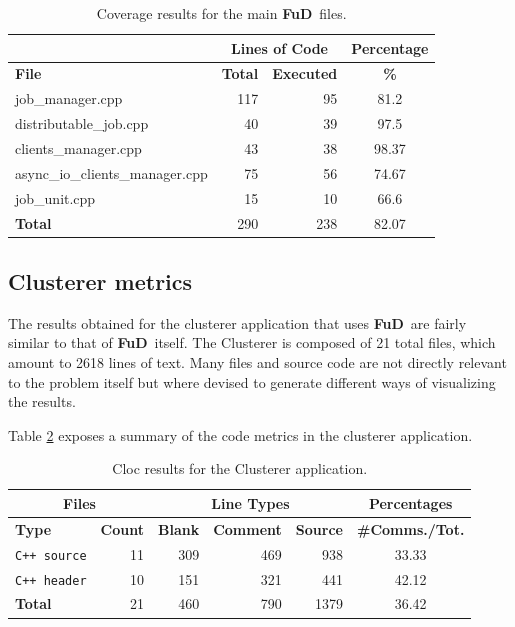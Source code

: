 \documentclass[a4paper,12pt,english]{report}
\newcommand{\fud}{\textbf{FuD}}
\begin{document}
\begin{table}[!htf]
\begin{center}
\begin{tabular}{|l|r|r|c|}
\hline
 & \multicolumn{2}{|c|}{Lines of Code} & Percentage \\
\hline
\textbf{File} & \textbf{Total} & \textbf{Executed} & \textbf{\%} \\
\hline
\scriptsize{job\_manager.cpp} & 117 & 95 & 81.2 \\
\hline 
\scriptsize{distributable\_job.cpp} & 40 & 39 & 97.5 \\
\hline 
\scriptsize{clients\_manager.cpp} & 43 & 38 & 98.37 \\
\hline 
\scriptsize{async\_io\_clients\_manager.cpp} & 75 & 56 & 74.67 \\
\hline 
\scriptsize{job\_unit.cpp} & 15 & 10 & 66.6 \\
\hline 
\textbf{Total} & 290 & 238 & 82.07 \\
\hline 
\end{tabular}
\caption{Coverage results for the main \fud \ files.} \label{fudcov}
\end{center}
\end{table}

\clearpage

\subsection{Clusterer metrics}

The results obtained for the clusterer application that uses \fud \ are fairly similar to that of \fud \ itself. The Clusterer is composed of 21 total files, which amount to 2618 lines of text. Many files and source code are not directly relevant to the problem itself but where devised to generate different ways of visualizing the results.

Table \ref{clocclusterer} exposes a summary of the code metrics in the clusterer application.

\begin{table}[!htf]
\begin{center}
\begin{tabular}{|l|r|r|r|r|c|}
\hline
\multicolumn{2}{|c|}{Files} & \multicolumn{3}{|c|}{Line Types} & Percentages \\
\hline
\textbf{Type} & \textbf{Count} & \textbf{Blank} & \textbf{Comment} & \textbf{Source} & \small{\textbf{\#Comms./Tot.}}\\ 
\hline
\texttt{C++ source} & 11   &    309  &     469   &    938 & 33.33\\
\hline
\texttt{C++ header} & 10   &    151  &     321   &    441 & 42.12\\
\hline
\textbf{Total}      &  21  &     460 &      790  &    1379 & 36.42\\
\hline
\end{tabular}
\caption{Cloc results for the Clusterer application.} \label{clocclusterer}
\end{center}
\end{table}
\end{document}
